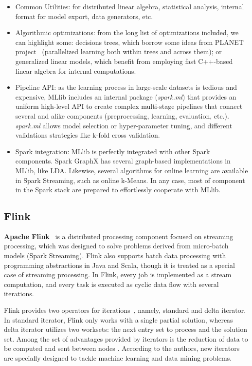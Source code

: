 \documentclass[3p,review]{elsarticle}
\begin{document}
	\begin{itemize}
		\item Common Utilities: for distributed linear algebra, statistical analysis, internal format for model export, data generators, etc. 
		\item Algorithmic optimizations: from the long list of optimizations included, we can highlight some: decisions trees, which borrow some ideas from PLANET project~\cite{panda09} (parallelized learning both within trees and across them); or generalized linear models, which benefit from employing fast C++-based linear algebra for internal computations.
		\item Pipeline API: as the learning process in large-scale datasets is tedious and expensive, MLlib includes an internal package (\emph{spark.ml}) that provides an uniform high-level API to create complex multi-stage pipelines that connect several and alike components (preprocessing, learning, evaluation, etc.). \emph{spark.ml} allows model selection or hyper-parameter tuning, and different validations strategies like k-fold cross validation.
		\item Spark integration: MLlib is perfectly integrated with other Spark components. Spark GraphX has several graph-based implementations in MLlib, like LDA. Likewise, several algorithms for online learning are available in Spark Streaming, such as online k-Means. In any case, most of component in the Spark stack are prepared to effortlessly cooperate with MLlib.
	\end{itemize}
	
	\subsection{Flink}\label{subsec:flink}
	
	\textbf{Apache Flink}~\cite{flink} is a distributed processing component focused on streaming processing, which was designed to solve problems derived from micro-batch models (Spark Streaming). Flink also supports batch data processing with programming abstractions in Java and Scala, though it is treated as a special case of streaming processing. In Flink, every job is implemented as a stream computation, and every task is executed as cyclic data flow with several iterations. 
	
	Flink provides two operators for iterations~\cite{flinkengine}, namely, standard and delta iterator. In standard iterator, Flink only works with a single partial solution, whereas delta iterator utilizes two worksets: the next entry set to process and the solution set.
	Among the set of advantages provided by iterators is the reduction of data to be computed and sent between nodes \cite{EwenTKM12}. According to the authors, new iterators are specially designed to tackle machine learning and data mining problems.
	
\end{document}
